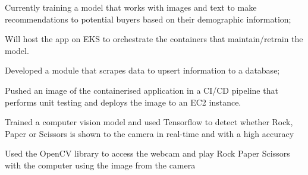 \documentclass[]{plushcv}
\begin{document}
\begin{minipage}[t]{0.70\textwidth}
\begin{tightemize}
\item Currently training a model that works with images and text to make recommendations to potential buyers based on their demographic information;
\item Will host the app on EKS to orchestrate the containers that maintain/retrain the model.
\end{tightemize}
\sectionsep

\begin{tightemize}
\item Developed a module that scrapes data to upsert information to a database;
\item Pushed an image of the containerised application in a CI/CD pipeline that performs unit testing and deploys the image to an EC2 instance.
\end{tightemize}
\sectionsep



\begin{tightemize}
\item Trained a computer vision model and used Tensorflow to detect whether Rock, Paper or Scissors is shown to the camera in real-time and with a high accuracy
\item Used the OpenCV library to access the webcam and play Rock Paper Scissors with the computer using the image from the camera
\end{tightemize}
\sectionsep


\end{minipage}
\end{document}
